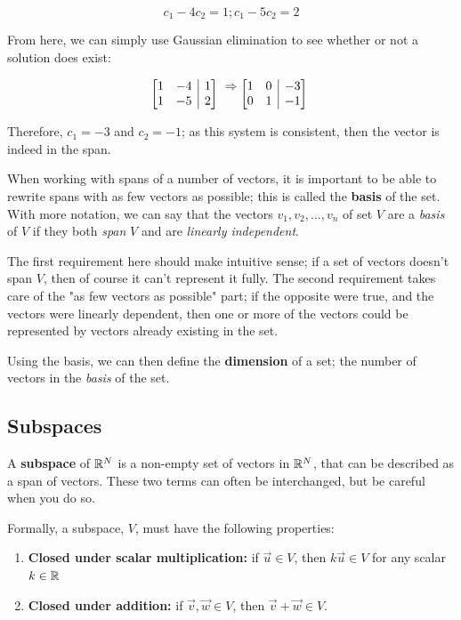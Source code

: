 \documentclass[12pt]{article}
\begin{document}
$$c_1 - 4 c_2 = 1; c_1 - 5 c_2 = 2$$

From here, we can simply use Gaussian elimination to see whether or not a solution does exist:

\[
    \begin{array}[t][{@{}cc|c@{}}]
     1 & -4 & 1 \\
     1 & -5 & 2 \\
    \end{array}\
    \Rightarrow
    \begin{array}[t][{@{}cc|c@{}}]
     1 & 0 & -3 \\
     0 & 1 & -1 \\
    \end{array}\
\]

Therefore, $c_1 = -3$ and $c_2 = -1$; as this system is consistent, then the vector is indeed in the span.

When working with spans of a number of vectors, it is important to be able to rewrite spans with as few vectors as possible; this is called the \textbf{basis} of the set. With more notation, we can say that the vectors $v_1, v_2, ..., v_n$ of set $V$ are a \textit{basis} of $V$ if they both \textit{span} $V$ and are \textit{linearly independent}. 

The first requirement here should make intuitive sense; if a set of vectors doesn't span $V$, then of course it can't represent it fully. 
The second requirement takes care of the "as few vectors as possible" part; if the opposite were true, and the vectors were linearly dependent, then one or more of the vectors could be represented by vectors already existing in the set.

Using the basis, we can then define the \textbf{dimension} of a set; the number of vectors in the \textit{basis} of the set.


\subsection{Subspaces}

A \textbf{subspace} of $\mathbb{R}^N$ is a non-empty set of vectors in $\mathbb{R}^N$, that can be described as a span of vectors. These two terms can often be interchanged, but be careful when you do so.

Formally, a subspace, $V$, must have the following properties:

\begin{enumerate}
    \item \textbf{Closed under scalar multiplication:} if $\Vec{u} \in V$, then $k\Vec{u} \in V$ for any scalar $k \in \mathbb{R}$ 
    \item \textbf{Closed under addition:} if $\Vec{v}, \Vec{w} \in V$, then $\Vec{v} + \Vec{w} \in V$.
\end{enumerate}
\end{document}
